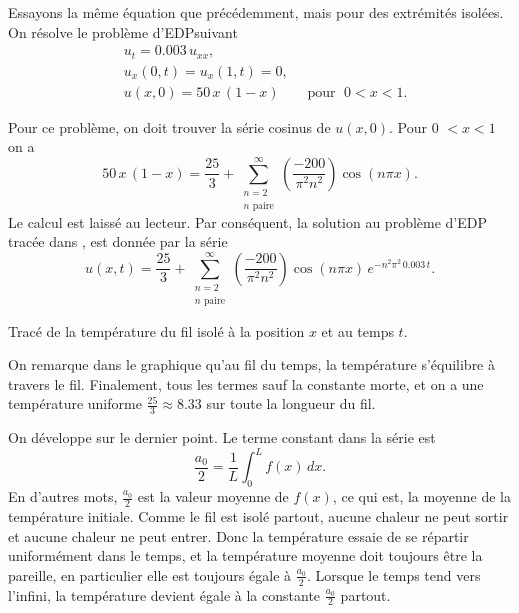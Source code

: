 \begin{example}
Essayons la même équation que précédemment,  mais pour des extrémités isolées.
On résolve le problème d'EDPsuivant
\begin{align*}
& u_t = 0.003 \, u_{xx} , \\
& u_x(0,t) = u_x(1,t) = 0 , \\
& u(x,0) = 50\,x\,(1-x) \qquad \text{pour } \; 0 < x < 1 .
\end{align*}

Pour ce problème,  on doit trouver la série cosinus de $ u (x, 0) $.
Pour 0 $ <x <1 $ on a
\begin{equation*}
50\, x\,(1-x)
=
\frac{25}{3} +
\sum_{\substack{n=2 \\ n \text{ paire}}}^\infty
\left( \frac{-200}{\pi^2 n^2} \right)
\cos (n \pi x) .
\end{equation*}
Le calcul est laissé au lecteur.
Par conséquent,  la solution au problème d'EDP tracée dans
,  est donnée par la série
\begin{equation*}
u(x,t)
=
\frac{25}{3} +
\sum_{\substack{n=2 \\ n \text{ paire}}}^\infty
\left( \frac{-200}{\pi^2 n^2} \right)
\cos ( n \pi x)
\, e^{-n^2 \pi^2 \, 0.003 \, t} .
\end{equation*}

\begin{myfig}
\capstart
{}
\caption{Tracé de la température du fil isolé à la position $ x $ et
au temps $ t $. \label{heat:wireisolexfig}}
\end{myfig}

On remarque dans le graphique
qu'au fil du temps,  la température s'équilibre à travers le fil.  Finalement,  tous les
termes sauf la constante
morte,  et on a une température uniforme
 $\frac{25}{3} \approx 8.33$ sur toute la longueur du fil.
\end{example}

On développe sur le dernier point.  Le terme constant dans la série est
\begin{equation*}
\frac{a_0}{2} = \frac{1}{L} \int_0^L f(x) \, dx .
\end{equation*}
En d'autres mots,  $\frac{a_0}{2}$ est la valeur moyenne de $f(x)$, ce qui est,
la moyenne de la température initiale.  Comme le fil est isolé
partout,  aucune chaleur ne peut sortir et aucune chaleur ne peut entrer.  Donc la température
essaie de se répartir uniformément dans le temps,  et la température moyenne doit toujours être la
pareille, en particulier elle est toujours égale à $\frac{a_0}{2}$.  
Lorsque le temps tend vers l'infini,  la température devient égale à la constante $\frac{a_0}{2}$ partout.

